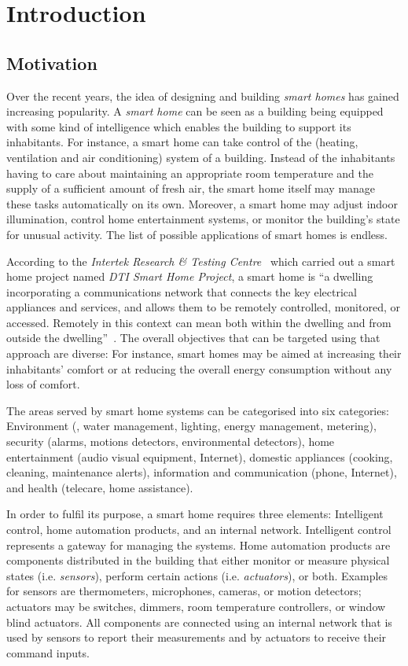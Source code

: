 \chapter{Introduction}
\label{ch:intro}

\section{Motivation}
\label{sec:motivation}

Over the recent years, the idea of designing and building \emph{smart homes} has gained increasing popularity. A \emph{smart home} can be seen as a building being equipped with some kind of intelligence which enables the building to support its inhabitants. For instance, a smart home can take control of the  (heating, ventilation and air conditioning) system of a building. Instead of the inhabitants having to care about maintaining an appropriate room temperature and the supply of a sufficient amount of fresh air, the smart home itself may manage these tasks automatically on its own. Moreover, a smart home may adjust indoor illumination, control home entertainment systems, or monitor the building's state for unusual activity. The list of possible applications of smart homes is endless.

According to the \emph{Intertek Research \& Testing Centre}~\cite{intertek} which carried out a smart home project named \emph{DTI Smart Home Project}, a smart home is ``a dwelling incorporating a communications network that connects the key electrical appliances and services, and allows them to be remotely controlled, monitored, or accessed. Remotely in this context can mean both within the dwelling and from outside the dwelling''~\cite{SmartHomeDefinition,SmartHomeResearch}. The overall objectives that can be targeted using that approach are diverse: For instance, smart homes may be aimed at increasing their inhabitants' comfort or at reducing the overall energy consumption without any loss of comfort.

The areas served by smart home systems can be categorised into six categories: Environment (, water management, lighting, energy management, metering), security (alarms, motions detectors, environmental detectors), home entertainment (audio visual equipment, Internet), domestic appliances (cooking, cleaning, maintenance alerts), information and communication (phone, Internet), and health (telecare, home assistance).

In order to fulfil its purpose, a smart home requires three elements: Intelligent control, home automation products, and an internal network. Intelligent control represents a gateway for managing the systems. Home automation products are components distributed in the building that either monitor or measure physical states (i.e. \emph{sensors}), perform certain actions (i.e. \emph{actuators}), or both. Examples for sensors are thermometers, microphones, cameras, or motion detectors; actuators may be switches, dimmers, room temperature controllers, or window blind actuators. All components are connected using an internal network that is used by sensors to report their measurements and by actuators to receive their command inputs.

